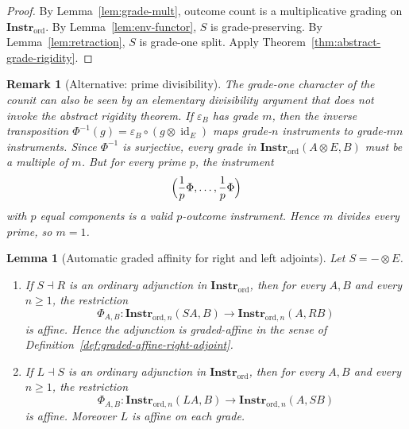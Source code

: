 \documentclass[11pt]{article}
\newtheorem{lemma}[theorem]{Lemma}
\newtheorem{remark}[theorem]{Remark}
\DeclareMathOperator{\id}{id}
\begin{document}
\begin{proof}
By Lemma~\ref{lem:grade-mult}, outcome count is a multiplicative grading on
$\mathbf{Instr}_{\mathrm{ord}}$. By Lemma~\ref{lem:env-functor}, $S$ is
grade-preserving. By Lemma~\ref{lem:retraction}, $S$ is grade-one split.
Apply Theorem~\ref{thm:abstract-grade-rigidity}.
\end{proof}

\begin{remark}[Alternative: prime divisibility]
\label{rem:prime-argument}
The grade-one character of the counit can also be seen by an elementary
divisibility argument that does not invoke the abstract rigidity theorem.
If $\varepsilon_B$ has grade $m$, then the inverse transposition
$\Phi^{-1}(g)=\varepsilon_B\circ(g\otimes\id_E)$ maps grade-$n$ instruments
to grade-$mn$ instruments. Since $\Phi^{-1}$ is surjective, every grade in
$\mathbf{Instr}_{\mathrm{ord}}(A\otimes E,B)$ must be a multiple of $m$.
But for every prime $p$, the instrument
\[
\Bigl(\frac{1}{p}\Phi,\dots,\frac{1}{p}\Phi\Bigr)
\]
with $p$ equal components is a valid $p$-outcome instrument. Hence $m$
divides every prime, so $m=1$.
\end{remark}

\begin{lemma}[Automatic graded affinity for right and left adjoints]
\label{lem:automaticgradedaffinity}
Let $S=-\otimes E$.
\begin{enumerate}
\item If $S\dashv R$ is an ordinary adjunction in
$\mathbf{Instr}_{\mathrm{ord}}$, then for every $A,B$ and every $n\ge1$,
the restriction
\[
\Phi_{A,B}:
\mathbf{Instr}_{\mathrm{ord},n}(SA,B)
\longrightarrow
\mathbf{Instr}_{\mathrm{ord},n}(A,RB)
\]
is affine. Hence the adjunction is graded-affine in the sense of
Definition~\ref{def:graded-affine-right-adjoint}.
\item If $L\dashv S$ is an ordinary adjunction in
$\mathbf{Instr}_{\mathrm{ord}}$, then for every $A,B$ and every $n\ge1$,
the restriction
\[
\Phi_{A,B}:
\mathbf{Instr}_{\mathrm{ord},n}(LA,B)
\longrightarrow
\mathbf{Instr}_{\mathrm{ord},n}(A,SB)
\]
is affine. Moreover $L$ is affine on each grade.
\end{enumerate}
\end{lemma}
\end{document}
